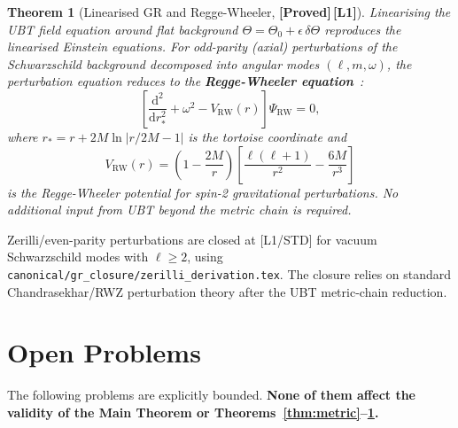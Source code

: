 \documentclass[12pt,a4paper]{article}
\newtheorem{theorem}{Theorem}[section]
\theoremstyle{definition}
\theoremstyle{remark}
\newcommand{\PROVED}{\textbf{[Proved]}}
\newcommand{\Lone}{\textbf{[L1]}}
\begin{document}
\begin{theorem}[Linearised GR and Regge-Wheeler, \PROVED\,\Lone]
\label{thm:rw}
Linearising the UBT field equation around flat background
$\Theta = \Theta_0 + \epsilon\,\delta\Theta$
reproduces the linearised Einstein equations.
For odd-parity (axial) perturbations of the Schwarzschild background
decomposed into angular modes $(\ell,m,\omega)$,
the perturbation equation reduces to the
\textbf{Regge-Wheeler equation}~\cite{regge_wheeler1957}:
\[
  \left[\frac{\mathrm{d}^2}{\mathrm{d}r_*^2} + \omega^2
        - V_{\mathrm{RW}}(r)\right]\Psi_{\mathrm{RW}} = 0,
\]
where $r_* = r + 2M\ln|r/2M - 1|$ is the tortoise coordinate and
\[
  V_{\mathrm{RW}}(r)
  = \left(1 - \frac{2M}{r}\right)
    \left[\frac{\ell(\ell+1)}{r^2} - \frac{6M}{r^3}\right]
\]
is the Regge-Wheeler potential for spin-2 gravitational perturbations.
No additional input from UBT beyond the metric chain is required.
\end{theorem}

\begin{tcolorbox}[colback=green!4!white,colframe=green!45!black,
  title={Zerilli equation (even-parity graviton): CLOSED [L1/STD]}]
Zerilli/even-parity perturbations are closed at [L1/STD] for vacuum
Schwarzschild modes with $\ell \ge 2$, using
\texttt{canonical/gr\_closure/zerilli\_derivation.tex}.
The closure relies on standard Chandrasekhar/RWZ perturbation theory
after the UBT metric-chain reduction.
\end{tcolorbox}

\section{Open Problems}
\label{sec:gaps}

The following problems are explicitly bounded.
\textbf{None of them affect the validity of the Main Theorem or
Theorems~\ref{thm:metric}--\ref{thm:rw}.}
\end{document}
